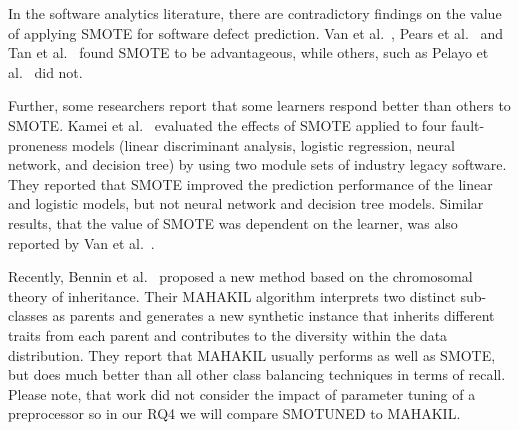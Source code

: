 \documentclass[sigconf]{acmart}
\theoremstyle{break}
\newcommand{\sma}{{\sc SMOTE}}
\newcommand{\smb}{{\sc SMOTUNED}}
\begin{document}


In the software analytics literature, there are contradictory findings on
the value of applying {\sma} for software defect prediction.
Van et al.~\cite{van2007experimental}, Pears et al.~\cite{pears2014synthetic} and Tan et al.~\cite{tan2015online} found {\sma} to be advantageous, while others, such as Pelayo et al.~\cite{pelayo2007applying} did not. 


Further, some researchers report that some learners respond better than others to {\sma}. Kamei et al.~\cite{kamei2007effects} evaluated the effects of {\sma} applied to  four fault-proneness models
(linear discriminant analysis, logistic regression, neural network, and decision tree) by
using two module sets of industry legacy software. They reported that {\sma} improved the prediction performance of the linear and logistic models, but not neural network and decision tree models. Similar results, that the value of {\sma} was dependent on the learner,
was also reported by Van et al.~\cite{van2007experimental}.

Recently, Bennin et al.~\cite{bennin2017mahakil}  proposed a new method based on the chromosomal theory of inheritance. 
Their MAHAKIL algorithm interprets two distinct sub-classes as parents and generates a new synthetic instance that inherits different traits from each parent and contributes to the diversity within the data distribution.
They report that MAHAKIL usually performs as well as  {\sma}, but
does much better than all   other class balancing techniques in terms of recall.
Please note, that work did not  consider the impact of parameter tuning of a preprocessor so in our RQ4 we will compare {\smb} to MAHAKIL.
\end{document}
